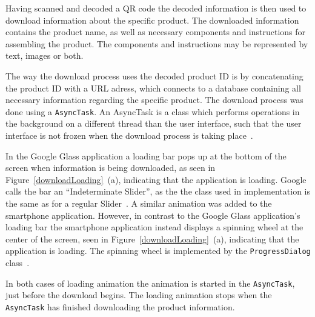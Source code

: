 

Having scanned and decoded a QR code the decoded information is then used to download information about the specific product. The downloaded information contains the product name, as well as necessary components and instructions for assembling the product. The components and instructions may be represented by text, images or both. 

The way the download process uses the decoded product ID is by concatenating the product ID with a URL adress, which connects to a database containing all necessary information regarding the specific product. The download process was done using a \texttt{AsyncTask}. An AsyncTask is a class which performs operations in the background on a different thread than the user interface, such that the user interface is not frozen when the download process is taking place~\cite{asyncTask}.

In the Google Glass application a loading bar pops up at the bottom of the screen when information is being downloaded, as seen in Figure~\ref{downloadLoading}~(a), indicating that the application is loading. Google calls the bar an ``Indeterminate Slider'', as the the class used in implementation is the same as for a regular Slider~\cite{indeterminateSlide}. A similar animation was added to the smartphone application. However, in contrast to the Google Glass application's loading bar the smartphone application instead displays a spinning wheel at the center of the screen, seen in Figure~\ref{downloadLoading}~(a), indicating that the application is loading. The spinning wheel is implemented by the \texttt{ProgressDialog} class~\cite{loadingWheel}.

In both cases of loading animation the animation is started in the \texttt{AsyncTask}, just before the download begins. The loading animation stops when the \texttt{AsyncTask} has finished downloading the product information.


